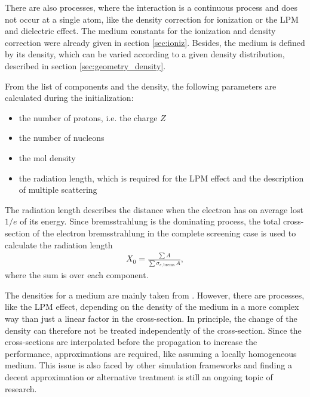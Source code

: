 There are also processes, where the interaction is a continuous process and does not occur at a single atom, like the density correction for ionization or the LPM and dielectric effect.
The medium constants for the ionization and density correction were already given in section \ref{sec:ioniz}.
Besides, the medium is defined by its density, which can be varied according to a given density distribution, described in section \ref{sec:geometry_density}.

From the list of components and the density, the following parameters are calculated during the initialization:
\begin{itemize}
    \item the number of protons, i.e. the charge $Z$
    \item the number of nucleons
    \item the mol density
    \item the radiation length, which is required for the LPM effect and the description of multiple scattering
\end{itemize}
The radiation length describes the distance when the electron has on average lost $1/e$ of its energy.
Since bremsstrahlung is the dominating process, the total cross-section of the electron bremsstrahlung in the complete screening case is used to calculate the radiation length
\begin{align}
    X_0 = \frac{\sum A}{\sum \sigma_{e, \text{brems.}} A} ,
\end{align}
where the sum is over each component.

The densities for a medium are mainly taken from \cite{PDG20}.
However, there are processes, like the LPM effect, depending on the density of the medium in a more complex way than just a linear factor in the cross-section.
In principle, the change of the density can therefore not be treated independently of the cross-section.
Since the cross-sections are interpolated before the propagation to increase the performance, approximations are required, like assuming a locally homogeneous medium.
This issue is also faced by other simulation frameworks and finding a decent approximation or alternative treatment is still an ongoing topic of research.

